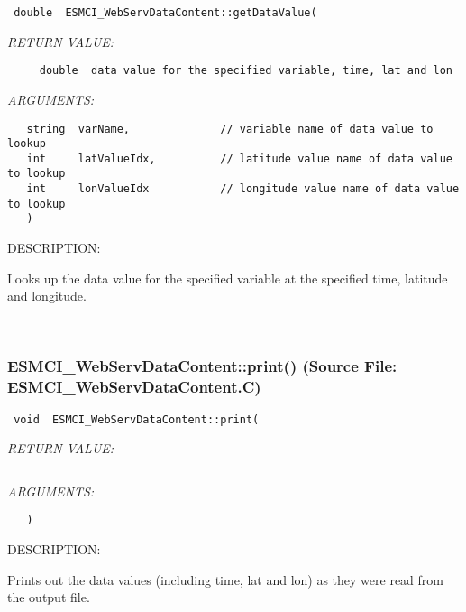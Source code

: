   
\begin{verbatim} double  ESMCI_WebServDataContent::getDataValue(\end{verbatim}{\em RETURN VALUE:}
\begin{verbatim}     double  data value for the specified variable, time, lat and lon\end{verbatim}{\em ARGUMENTS:}
\begin{verbatim}   string  varName,              // variable name of data value to lookup
   int     latValueIdx,          // latitude value name of data value to lookup
   int     lonValueIdx           // longitude value name of data value to lookup
   )\end{verbatim}
{\sf DESCRIPTION:\\ }


      Looks up the data value for the specified variable at the specified
      time, latitude and longitude.
   
 
\mbox{}\hrulefill\
 
\subsubsection{ESMCI\_WebServDataContent::print() (Source File: ESMCI\_WebServDataContent.C)}


  
\begin{verbatim} void  ESMCI_WebServDataContent::print(\end{verbatim}{\em RETURN VALUE:}
\begin{verbatim} \end{verbatim}{\em ARGUMENTS:}
\begin{verbatim}   )\end{verbatim}
{\sf DESCRIPTION:\\ }


      Prints out the data values (including time, lat and lon) as they were
      read from the output file.
  
\setlength{\parskip}{\oldparskip}
\setlength{\parindent}{\oldparindent}
\setlength{\baselineskip}{\oldbaselineskip}
